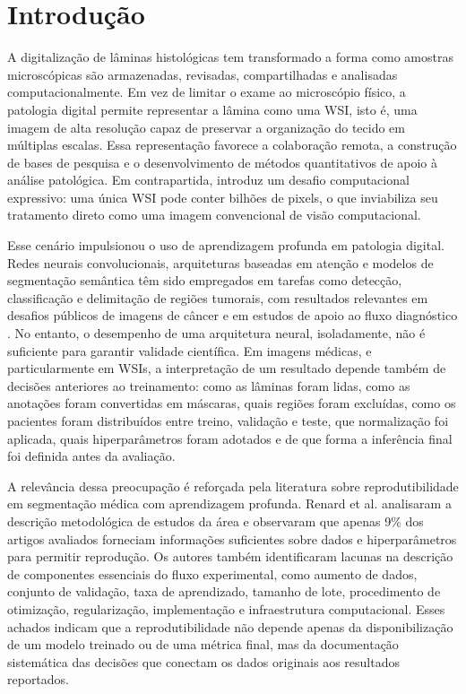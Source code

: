 \chapter{Introdução}\label{chp:Introducao}

A digitalização de lâminas histológicas tem transformado a forma como amostras microscópicas são armazenadas, revisadas, compartilhadas e analisadas computacionalmente. Em vez de limitar o exame ao microscópio físico, a patologia digital permite representar a lâmina como uma WSI, isto é, uma imagem de alta resolução capaz de preservar a organização do tecido em múltiplas escalas. Essa representação favorece a colaboração remota, a construção de bases de pesquisa e o desenvolvimento de métodos quantitativos de apoio à análise patológica. Em contrapartida, introduz um desafio computacional expressivo: uma única WSI pode conter bilhões de pixels, o que inviabiliza seu tratamento direto como uma imagem convencional de visão computacional.

Esse cenário impulsionou o uso de aprendizagem profunda em patologia digital. Redes neurais convolucionais, arquiteturas baseadas em atenção e modelos de segmentação semântica têm sido empregados em tarefas como detecção, classificação e delimitação de regiões tumorais, com resultados relevantes em desafios públicos de imagens de câncer e em estudos de apoio ao fluxo diagnóstico \cite{bejnordi2017diagnostic,bandi2019resolution,campanella2025clinical}. No entanto, o desempenho de uma arquitetura neural, isoladamente, não é suficiente para garantir validade científica. Em imagens médicas, e particularmente em WSIs, a interpretação de um resultado depende também de decisões anteriores ao treinamento: como as lâminas foram lidas, como as anotações foram convertidas em máscaras, quais regiões foram excluídas, como os pacientes foram distribuídos entre treino, validação e teste, que normalização foi aplicada, quais hiperparâmetros foram adotados e de que forma a inferência final foi definida antes da avaliação.

A relevância dessa preocupação é reforçada pela literatura sobre reprodutibilidade em segmentação médica com aprendizagem profunda. Renard et al. \cite{renard2020variability} analisaram a descrição metodológica de estudos da área e observaram que apenas 9\% dos artigos avaliados forneciam informações suficientes sobre dados e hiperparâmetros para permitir reprodução. Os autores também identificaram lacunas na descrição de componentes essenciais do fluxo experimental, como aumento de dados, conjunto de validação, taxa de aprendizado, tamanho de lote, procedimento de otimização, regularização, implementação e infraestrutura computacional. Esses achados indicam que a reprodutibilidade não depende apenas da disponibilização de um modelo treinado ou de uma métrica final, mas da documentação sistemática das decisões que conectam os dados originais aos resultados reportados.


